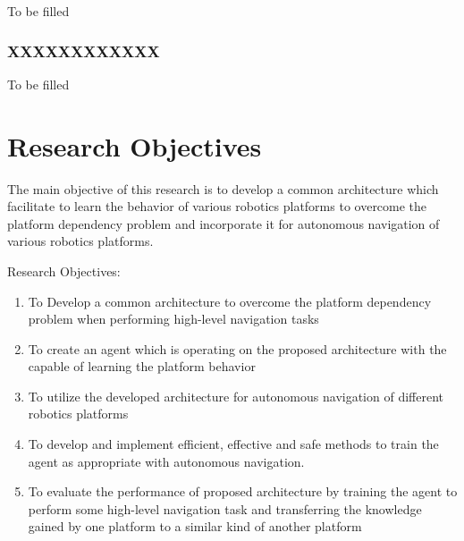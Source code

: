 \documentclass[a4paper,oneside,12pt]{report}
\begin{document}
To be filled

\subsection{XXXXXXXXXXXX}

To be filled

\chapter{Research Objectives}
\label{ch:research objectives}

The main objective of this research is to develop a common architecture which facilitate to learn the behavior of various robotics platforms to overcome the platform dependency problem and incorporate it for autonomous navigation of various robotics platforms. 

Research Objectives:

\begin{enumerate}
\item To Develop a common architecture to overcome the platform dependency problem when performing high-level navigation tasks

\item To create an agent which is operating on the proposed architecture with the capable of learning the platform behavior 

\item To utilize the developed architecture for autonomous navigation of different robotics platforms 

\item To develop and implement efficient, effective and safe methods to train the agent as appropriate with autonomous navigation.  

\item To evaluate the performance of proposed architecture by training the agent to perform some high-level navigation task and transferring the knowledge gained by one platform to a similar kind of another platform 




\end{enumerate}

\end{document}
